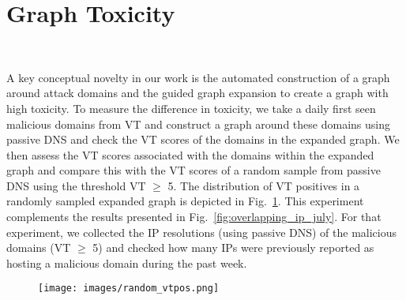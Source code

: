 
\section{Graph Toxicity}
~\label{app:graphtoxicity}

A key conceptual novelty in our work is the automated construction of a graph around attack domains and the guided graph expansion to create a graph with high toxicity. 
To measure the difference in toxicity, we take a daily first seen malicious domains from VT and construct a graph around these domains using passive DNS and check the VT scores of the domains in the expanded graph.
We then assess the VT scores associated with the domains within the expanded graph and compare this with the VT scores of a random sample from passive DNS using the threshold VT $\geq$ 5. The distribution of VT positives in a randomly sampled expanded graph is depicted in Fig.~\ref{fig:random_vt}. This experiment complements the results presented in Fig.~\ref{fig:overlapping_ip_july}. For that experiment, we collected the IP resolutions (using passive DNS) of the malicious domains (VT $\geq$ 5) and checked how many IPs were previously reported as hosting a malicious domain during the past week. 

\begin{figure}[ht]
\centering
\texttt{[image: images/random\_vtpos.png]}
\caption{}
\label{fig:random_vt}
\end{figure}





